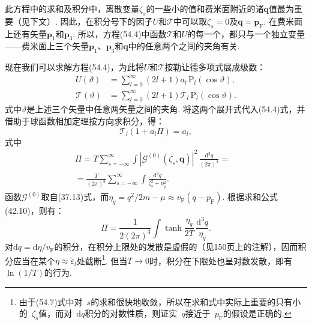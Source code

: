 此方程中的求和及积分中，离散变量$\zeta_s$的一些小的值和费米面附近的诸$\bm{q}$值最为重要（见下文）. 因此，在积分号下的因子$U$和$\mathcal{T}$中可以取$\zeta_s=0$及$\bm{q}=\bm{p}_{\mathrm{F}}$. 在费米面上还有矢量$\bm{p}_1$和$\bm{p}_3$. 所以，方程(54.4)中函数$\mathcal{T}$和$U$的每一个，都只与一个独立变量——费米面上三个矢量$\bm{p}_1$、$\bm{p}_3$和$\bm{q}$中的任意两个之间的夹角有关.

现在我们可以求解方程(54.4)，为此将$U$和$\mathcal{T}$按勒让德多项式展成级数：
\begin{equation}
\begin{aligned}
U(\vartheta)&=\sum_{l=0}^{\infty}(2l+1)a_l\,\mathrm{P}_l(\cos\vartheta),\\
\mathcal{T}(\vartheta)&=\sum_{l=0}^{\infty}(2l+1)\mathcal{T}_l\,\mathrm{P}_l(\cos\vartheta).
\end{aligned}
\end{equation}
式中$\vartheta$是上述三个矢量中任意两矢量之间的夹角. 将这两个展开式代入(54.4)式，并借助于球函数相加定理按方向求积分，得：
\begin{equation}
\mathcal{T}_l(1+a_l\Pi)=a_l,
\end{equation}
式中
\begin{equation}
\begin{aligned}
\Pi=T\sum_{s=-\infty}^{\infty}\int
|\mathcal{G}^{(0)}(\zeta_s,\bm{q})|^2\,\frac{\mathrm{d}^3q}{(2\pi)^3}
={}&\\
{}=\frac{T}{(2\pi)^3}\sum_{s=-\infty}^{\infty}
\int\frac{\mathrm{d}^3q}{\zeta_s^2+\eta_q^2}.
\end{aligned}
\end{equation}
函数$\mathcal{G}^{(0)}$取自(37.13)式，而$\eta_q=q^2/2m-\mu\approx v_{\mathrm{F}}(q-p_{\mathrm{F}})$. 根据求和公式(42.10)，则有：
\begin{equation}
\Pi=\frac{1}{2(2\pi)^3}\int\tanh\frac{\eta_q}{2T}\,
\frac{\mathrm{d}^3q}{\eta_q}.
\end{equation}
对$\mathrm{d}q=\mathrm{d}\eta/v_{\mathrm{F}}$的积分，在积分上限处的发散是虚假的（见150页上的注解），因而积分应当在某个$\eta\approx\tilde{\varepsilon}_l$处截断\footnote{由于(54.7)式中对~$s$的求和很快地收敛，所以在求和式中实际上重要的只有小的~$\zeta_s$值，而对~$\mathrm dq$积分的对数性质，则证实~$q$接近于~$p_{\mathrm F}$的假设是正确的.}. 但当$T\to0$时，积分在下限处也呈对数发散，即有$\ln(1/T)$的行为.

